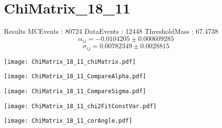 \documentclass[a4paper,12pt]{article}
\begin{document}
\section{ChiMatrix\_18\_11}
\begin{minipage}{0.49\linewidth} Results \newline
MCEvents : 80724\newline
DataEvents : 12448 \newline
ThresholdMass : 67.4738\\
$$\alpha_{ij} = -0.0104205\pm 0.000609285$$
$$\sigma_{ij} = 0.00782349\pm 0.0028815$$
\end{minipage}\hfill
\begin{minipage}{0.49\linewidth} 
\texttt{[image: ChiMatrix\_18\_11\_chiMatrix.pdf]}\\
\end{minipage}
\hfill
\begin{minipage}{0.49\linewidth} 
\texttt{[image: ChiMatrix\_18\_11\_CompareAlpha.pdf]}\\
\end{minipage}
\hfill
\begin{minipage}{0.49\linewidth} 
\texttt{[image: ChiMatrix\_18\_11\_CompareSigma.pdf]}\\
\end{minipage}
\begin{minipage}{0.49\linewidth} 
\texttt{[image: ChiMatrix\_18\_11\_chi2FitConstVar.pdf]}\\
\end{minipage}
\hfill
\begin{minipage}{0.49\linewidth} 
\texttt{[image: ChiMatrix\_18\_11\_corAngle.pdf]}\\
\end{minipage}
\end{document}
